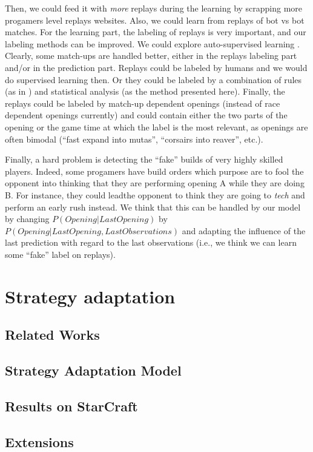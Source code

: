 Then, we could feed it with \textit{more} replays during the learning by scrapping more progamers level replays websites. Also, we could learn from replays of bot vs bot matches. For the learning part, the labeling of replays is very important, and our labeling methods can be improved. 
We could explore auto-supervised learning \citep{AutoSuperLearning}. 
Clearly, some match-ups are handled better, either in the replays labeling part and/or in the prediction part. Replays could be labeled by humans and we would do supervised learning then. Or they could be labeled by a combination of rules (as in \citep{weber}) and statistical analysis (as the method presented here). Finally, the replays could be labeled by match-up dependent openings (instead of race dependent openings currently) and could contain either the two parts of the opening %
or the game time at which the label is the most relevant, as openings are often bimodal (``fast expand into mutas'', ``corsairs into reaver'', etc.).

Finally, a hard problem is detecting the ``fake'' builds of very highly skilled players. Indeed, some progamers have build orders which purpose are to fool the opponent into thinking that they are performing opening A while they are doing B. %
For instance, they could leadthe opponent to think they are going to \textit{tech} 
and perform an early rush instead. We think that this can be handled by our model by changing $P(Opening|LastOpening)$ by $P(Opening|LastOpening, LastObservations)$ and adapting the influence of the last prediction with regard to the last observations (i.e., we think we can learn some ``fake'' label on replays).

\section{Strategy adaptation}

\subsection{Related Works}
\subsection{Strategy Adaptation Model}
\subsection{Results on StarCraft}
\subsection{Extensions}





